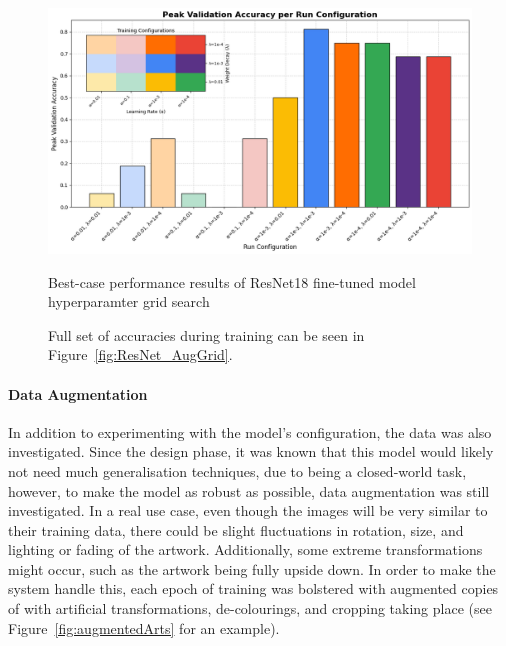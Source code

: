                         \begin{figure}[h]
                            \centering
                            \includegraphics[width=\textwidth]{images/ResNetCNN_AugGridHist.png}
                            \caption{Best-case performance results of ResNet18 fine-tuned model hyperparamter grid search}
                            \caption*{
                                Full set of accuracies during training can be seen in Figure~\ref{fig:ResNet_AugGrid}.
                            }
                            \label{fig:ResNet_AugGridHist}
                        \end{figure}
        
                    \paragraph{Data Augmentation}
        
                        In addition to experimenting with the model's configuration, the data was also investigated. Since the design phase, it was known that this model would likely not need much generalisation techniques, due to being a closed-world task, however, to make the model as robust as possible, data augmentation was still investigated. In a real use case, even though the images will be very similar to their training data, there could be slight fluctuations in rotation, size, and lighting or fading of the artwork. Additionally, some extreme transformations might occur, such as the artwork being fully upside down. In order to make the system handle this, each epoch of training was bolstered with augmented copies of with artificial transformations, de-colourings, and cropping taking place (see Figure~\ref{fig:augmentedArts} for an example).
    
